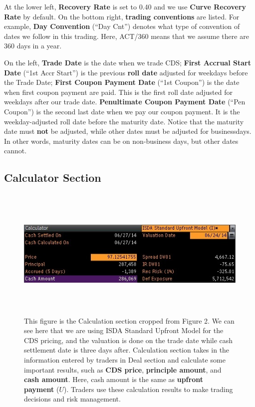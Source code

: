 \documentclass{jss}
\begin{document}
At the lower left, \textbf{Recovery Rate} is set to 0.40 and we use \textbf{Curve Recovery Rate} by default. On the bottom right, \textbf{trading conventions} are listed. For example, \textbf{Day Convention} (``Day Cnt'') denotes what type of convention of dates we follow in this trading. Here, ACT/360 means that we assume there are 360 days in a year. 

On the left, \textbf{Trade Date} is the date when we trade CDS; \textbf{First Accrual Start Date} (``1st Accr Start'') is the previous \textbf{roll date} adjusted for weekdays before the Trade Date; \textbf{First Coupon Payment Date} (``1st Coupon'') is the date when first coupon payment are paid. This is the first roll date adjusted for weekdays after our trade date. \textbf{Penultimate Coupon Payment Date} (``Pen Coupon'') is the second last date when we pay our coupon payment. It is the weekday-adjusted roll date before the maturity date. Notice that the maturity date must \textbf{not} be adjusted, while other dates must be adjusted for businessdays. In other words, maturity dates can be on non-business days, but other dates cannot.

\newpage
\subsection{Calculator Section}
\label{Calculator section}
\begin{figure}[H]
\centering
\includegraphics[width=5.5in, height=2.5in]{images/AlcoaIncCDSCalculator.jpg}
\caption{
This figure is the Calculation section cropped from Figure 2. We can see here that we are using ISDA Standard Upfront Model for the CDS pricing, and the valuation is done on the trade date while cash settlement date is three days after. Calculation section takes in the information entered by traders in Deal section and calculate some important results,  such as \textbf{CDS price}, \textbf{principle amount}, and \textbf{cash amount}. Here, cash amount is the same as \textbf{upfront payment} ($U$). Traders use these calculation results to make trading decisions and risk management.}
\label{AlcoaIncCDSCalculator}
\end{figure}
\end{document}
